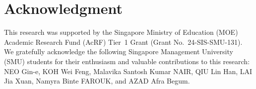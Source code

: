 \documentclass[conference]{IEEEtran}
\begin{document}
\section*{Acknowledgment}
This research was supported by the Singapore Ministry of Education (MOE)
Academic Research Fund (AcRF) Tier~1 Grant (Grant No.~24-SIS-SMU-131). We gratefully
acknowledge the following Singapore Management University (SMU) students for
their enthusiasm and valuable contributions to this research: NEO Gin-e, KOH Wei
Feng, Malavika Santosh Kumar NAIR, QIU Lin Han, LAI Jia Xuan, Namyra Binte
FAROUK, and AZAD Afra Begum.

\balance


\end{document}
